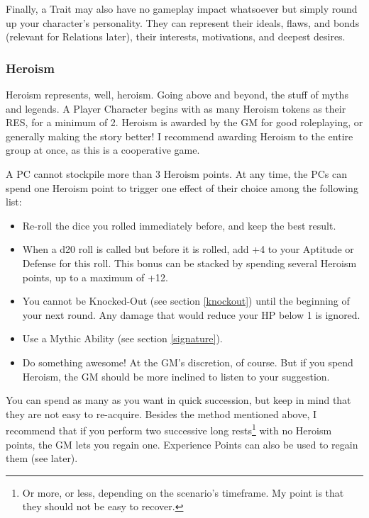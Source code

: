 Finally, a Trait may also have no gameplay impact whatsoever but simply round up your character's personality. They can represent their ideals, flaws, and bonds (relevant for Relations later), their interests, motivations, and deepest desires.

\subsubsection{Heroism}

\label{heroism}

Heroism represents, well, heroism. Going above and beyond, the stuff of myths and legends. A Player Character begins with as many Heroism tokens as their RES, for a minimum of 2. Heroism is awarded by the GM for good roleplaying, or generally making the story better! I recommend awarding Heroism to the entire group at once, as this is a cooperative game. 

A PC cannot stockpile more than 3 Heroism points. At any time, the PCs can spend one Heroism point to trigger one effect of their choice among the following list:

\begin{itemize}
    \item Re-roll the dice you rolled immediately before, and keep the best result.
    \item When a d20 roll is called but before it is rolled, add +4 to your Aptitude or Defense for this roll. This bonus can be stacked by spending several Heroism points, up to a maximum of +12.
    \item You cannot be Knocked-Out (see section \ref{knockout}) until the beginning of your next round. Any damage that would reduce your HP below 1 is ignored.
    \item Use a Mythic Ability (see section \ref{signature}).
    \item Do something awesome! At the GM's discretion, of course. But if you spend Heroism, the GM should be more inclined to listen to your suggestion.
\end{itemize}

You can spend as many as you want in quick succession, but keep in mind that they are not easy to re-acquire. Besides the method mentioned above, I recommend that if you perform two successive long rests\footnote{Or more, or less, depending on the scenario's timeframe. My point is that they should not be easy to recover.} with no Heroism points, the GM lets you regain one. Experience Points can also be used to regain them (see later).

